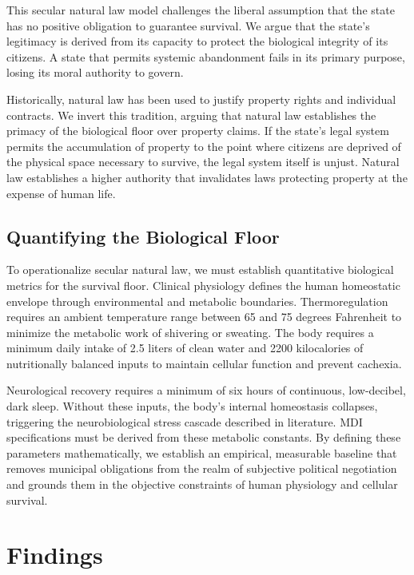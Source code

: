 \documentclass[12pt]{article}
\begin{document}
This secular natural law model challenges the liberal assumption that the state has no positive obligation to guarantee survival. We argue that the state's legitimacy is derived from its capacity to protect the biological integrity of its citizens. A state that permits systemic abandonment fails in its primary purpose, losing its moral authority to govern.

Historically, natural law has been used to justify property rights and individual contracts. We invert this tradition, arguing that natural law establishes the primacy of the biological floor over property claims. If the state's legal system permits the accumulation of property to the point where citizens are deprived of the physical space necessary to survive, the legal system itself is unjust. Natural law establishes a higher authority that invalidates laws protecting property at the expense of human life.

\subsection{Quantifying the Biological Floor}
To operationalize secular natural law, we must establish quantitative biological metrics for the survival floor. Clinical physiology defines the human homeostatic envelope through environmental and metabolic boundaries. Thermoregulation requires an ambient temperature range between 65 and 75 degrees Fahrenheit to minimize the metabolic work of shivering or sweating. The body requires a minimum daily intake of 2.5 liters of clean water and 2200 kilocalories of nutritionally balanced inputs to maintain cellular function and prevent cachexia.

Neurological recovery requires a minimum of six hours of continuous, low-decibel, dark sleep. Without these inputs, the body's internal homeostasis collapses, triggering the neurobiological stress cascade described in literature. MDI specifications must be derived from these metabolic constants. By defining these parameters mathematically, we establish an empirical, measurable baseline that removes municipal obligations from the realm of subjective political negotiation and grounds them in the objective constraints of human physiology and cellular survival.

\section{Findings}
\end{document}
